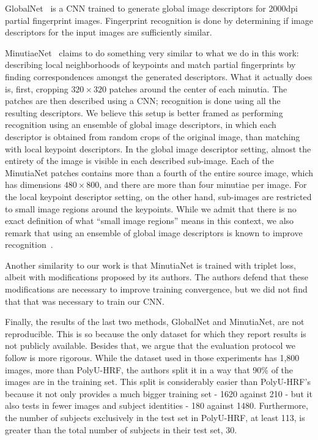 \documentclass[10pt,twocolumn,letterpaper]{article}
\begin{document}
GlobalNet~\cite{zhang-pattern-rec} is a CNN trained to generate global image descriptors for 2000dpi partial fingerprint images.
Fingerprint recognition is done by determining if image descriptors for the input images are sufficiently similar.

MinutiaeNet~\cite{zhang-pattern-rec} claims to do something very similar to what we do in this work: describing local neighborhoods of keypoints and match partial fingerprints by finding correspondences amongst the generated descriptors.
What it actually does is, first, cropping ${320 \times 320}$ patches around the center of each minutia.
The patches are then described using a CNN; recognition is done using all the resulting descriptors.
We believe this setup is better framed as performing recognition using an ensemble of global image descriptors, in which each descriptor is obtained from random crops of the original image, than matching with local keypoint descriptors.
In the global image descriptor setting, almost the entirety of the image is visible in each described sub-image.
Each of the MinutiaNet patches contains more than a fourth of the entire source image, which has dimensions ${480 \times 800}$, and there are more than four minutiae per image.
For the local keypoint descriptor setting, on the other hand, sub-images are restricted to small image regions around the keypoints.
While we admit that there is no exact definition of what ``small image regions'' means in this context, we also remark that using an ensemble of global image descriptors is known to improve recognition~\cite{vggface}.

Another similarity to our work is that MinutiaNet is trained with triplet loss, albeit with modifications proposed by its authors.
The authors defend that these modifications are necessary to improve training convergence, but we did not find that that was necessary to train our CNN.

Finally, the results of the last two methods, GlobalNet and MinutiaNet, are not reproducible.
This is so because the only dataset for which they report results is not publicly available.
Besides that, we argue that the evaluation protocol we follow is more rigorous.
While the dataset used in those experiments has 1,800 images, more than PolyU-HRF, the authors split it in a way that 90\% of the images are in the training set.
This split is considerably easier than PolyU-HRF's because it not only provides a much bigger training set - 1620 against 210 - but it also tests in fewer images and subject identities - 180 against 1480.
Furthermore, the number of subjects exclusively in the test set in PolyU-HRF, at least 113, is greater than the total number of subjects in their test set, 30.
\end{document}
